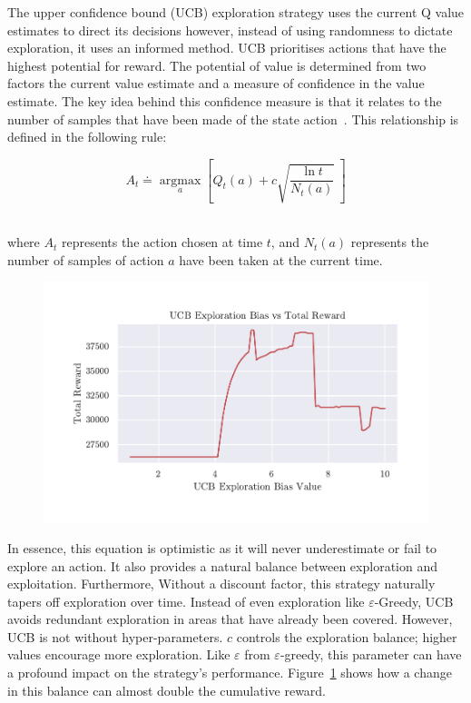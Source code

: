 \documentclass[]{final_report}
\begin{document}
The upper confidence bound (UCB) exploration strategy uses the current Q value estimates to direct its decisions however, instead of using randomness to dictate exploration, it uses an informed method. UCB prioritises actions that have the highest potential for reward. The potential of value is determined from two factors the current value estimate and a measure of confidence in the value estimate. The key idea behind this confidence measure is that it relates to the number of samples that have been made of the state action~\cite{sutton2018reinforcement}. This relationship is defined in the following rule:


\begin{equation}
  A_t \doteq \underset{a}{\operatorname{argmax}}\left [Q_t(a)+ c\sqrt{\frac{\ln t}{N_t(a)}} \ \right ]
  \label{eqn:ucb}
\end{equation}
~\cite{sutton2018reinforcement}

where $A_t$ represents the action chosen at time $t$, and $N_t(a)$ represents the number of samples of action $a$ have been taken at the current time. 

\begin{figure}[H]
  \centering
  
  \includegraphics[trim={0 1cm 0 1cm},clip,width=\textwidth]{hyper-paramiters/ucb-exploration}
  
  \caption{\label{fig:ucb-exploration-bias}}
\end{figure}


In essence, this equation is optimistic as it will never underestimate or fail to explore an action. It also provides a natural balance between exploration and exploitation. Furthermore, Without a discount factor, this strategy naturally tapers off exploration over time. Instead of even exploration like $\varepsilon$-Greedy, UCB avoids redundant exploration in areas that have already been covered. However, UCB is not without hyper-parameters. $c$ controls the exploration balance; higher values encourage more exploration. Like $\varepsilon$ from $\varepsilon$-greedy, this parameter can have a profound impact on the strategy's performance. Figure~\ref{fig:ucb-exploration-bias} shows how a change in this balance can almost double the cumulative reward. 
\end{document}
